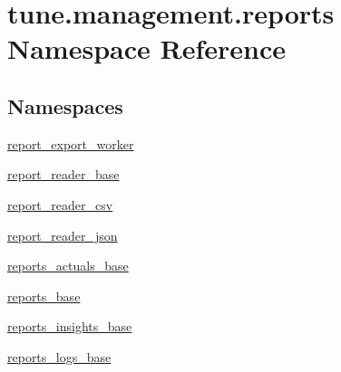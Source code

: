 \hypertarget{namespacetune_1_1management_1_1reports}{\section{tune.\-management.\-reports Namespace Reference}
\label{namespacetune_1_1management_1_1reports}
}
\subsection*{Namespaces}
\begin{DoxyCompactItemize}
\item 
\hyperlink{namespacetune_1_1management_1_1reports_1_1report__export__worker}{report\-\_\-export\-\_\-worker}
\item 
\hyperlink{namespacetune_1_1management_1_1reports_1_1report__reader__base}{report\-\_\-reader\-\_\-base}
\item 
\hyperlink{namespacetune_1_1management_1_1reports_1_1report__reader__csv}{report\-\_\-reader\-\_\-csv}
\item 
\hyperlink{namespacetune_1_1management_1_1reports_1_1report__reader__json}{report\-\_\-reader\-\_\-json}
\item 
\hyperlink{namespacetune_1_1management_1_1reports_1_1reports__actuals__base}{reports\-\_\-actuals\-\_\-base}
\item 
\hyperlink{namespacetune_1_1management_1_1reports_1_1reports__base}{reports\-\_\-base}
\item 
\hyperlink{namespacetune_1_1management_1_1reports_1_1reports__insights__base}{reports\-\_\-insights\-\_\-base}
\item 
\hyperlink{namespacetune_1_1management_1_1reports_1_1reports__logs__base}{reports\-\_\-logs\-\_\-base}
\end{DoxyCompactItemize}
